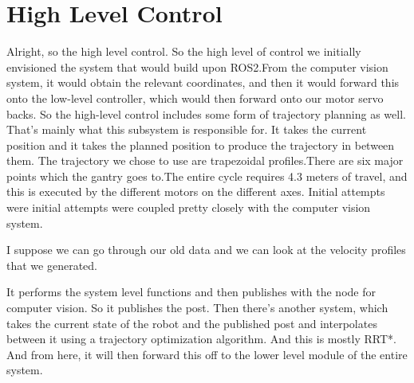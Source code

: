 \chapter{High Level Control}

Alright, so the high level control. So the high level of control we initially envisioned the system that would build upon ROS2.From the computer vision system, it would obtain the relevant coordinates, and then it would forward this onto the low-level controller, which would then forward onto our motor servo backs. So the high-level control includes some form of trajectory planning as well. That's mainly what this subsystem is responsible for. It takes the current position and it takes the planned position to produce the trajectory in between them. The trajectory we chose to use are trapezoidal profiles.There are six major points which the gantry goes to.The entire cycle requires 4.3 meters of travel, and this is executed by the different motors on the different axes. Initial attempts were initial attempts were coupled pretty closely with the computer vision system.

I suppose we can go through our old data and we can look at the velocity profiles that we generated.

It performs the system level functions and then publishes with the node for computer vision. So it publishes the post. Then there's another system, which takes the current state of the robot and the published post and interpolates between it using a trajectory optimization algorithm. And this is mostly RRT*. And from here, it will then forward this off to the lower level module of the entire system.

